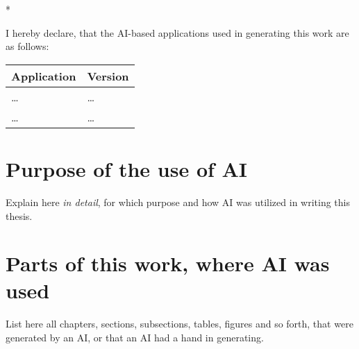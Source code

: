 \begin{aidisclaimer} * %

I hereby declare, that the AI-based applications used in generating this work are as follows:

\begin{center}
    \begin{tabularx}{\linewidth}{X|l}
        \toprule
        \textbf{Application} & \textbf{Version} \\
        \midrule
        \dots & \dots \\
        \dots & \dots \\
        \bottomrule
    \end{tabularx}
\end{center}

\section*{Purpose of the use of AI}

Explain here \emph{in detail}, for which purpose and how AI was utilized in writing this thesis.

\section*{Parts of this work,  where AI was used}

List here all chapters, sections, subsections, tables, figures and so forth,
that were generated by an AI, or that an AI had a hand in generating.

\end{aidisclaimer}

